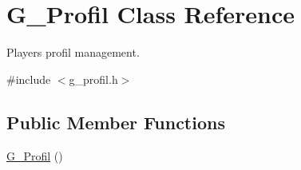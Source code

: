 \hypertarget{class_g___profil}{}\section{G\+\_\+\+Profil Class Reference}
\label{class_g___profil}


Player\textquotesingle{}s profil management.  




{\ttfamily \#include $<$g\+\_\+profil.\+h$>$}

\subsection*{Public Member Functions}
\begin{DoxyCompactItemize}
\item 
\hypertarget{class_g___profil_a0c6c8390537b9ecc63c6803ae5275a02}{}\hyperlink{class_g___profil_a0c6c8390537b9ecc63c6803ae5275a02}{G\+\_\+\+Profil} ()\label{class_g___profil_a0c6c8390537b9ecc63c6803ae5275a02}


\end{DoxyCompactItemize}
